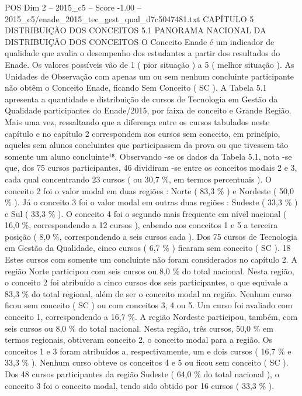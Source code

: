 \begin{textsample}{POS Dim 2 – 2015\_c5 – Score -1.00 – 2015\_c5/enade\_2015\_tec\_gest\_qual\_d7c5047481.txt}  \label{ex:f2_pos_277}
CAPÍTULO 5 DISTRIBUIÇÃO DOS CONCEITOS 5.1 PANORAMA NACIONAL DA DISTRIBUIÇÃO DOS CONCEITOS O Conceito Enade é um indicador de qualidade que avalia o desempenho dos estudantes a partir dos resultados do Enade.
Os valores possíveis vão de 1 ( pior situação ) a 5 ( melhor situação ).
As Unidades de Observação com apenas um ou sem nenhum concluinte participante não obtêm o Conceito Enade, ficando Sem Conceito ( SC ).
A Tabela 5.1 apresenta a quantidade e distribuição de cursos de Tecnologia em Gestão da Qualidade participantes do Enade/2015, por faixa de conceito e Grande Região.
Mais uma vez, ressaltando que a diferença entre os cursos tabulados neste capítulo e no capítulo 2 correspondem aos cursos sem conceito, em princípio, aqueles sem alunos concluintes que participassem da prova ou que tivessem tão somente um aluno concluinte¹⁸.
Observando -se os dados da Tabela 5.1, nota -se que, dos 75 cursos participantes, 46 dividiram -se entre os conceitos modais 2 e 3, cada qual concentrando 23 cursos ( ou 30,7 \%, em termos percentuais ).
O conceito 2 foi o valor modal em duas regiões : Norte ( 83,3 \% ) e Nordeste ( 50,0 \% ).
Já o conceito 3 foi o valor modal em outras duas regiões : Sudeste ( 33,3 \% ) e Sul ( 33,3 \% ).
O conceito 4 foi o segundo mais frequente em nível nacional ( 16,0 \%, correspondendo a 12 cursos ), cabendo aos conceitos 1 e 5 a terceira posição ( 8,0 \%, correspondendo a seis cursos cada ).
Dos 75 cursos de Tecnologia em Gestão da Qualidade, cinco cursos ( 6,7 \% ) ficaram sem conceito ( SC ). 18 Estes cursos com somente um concluinte não foram considerados no capítulo 2.
A região Norte participou com seis cursos ou 8,0 \% do total nacional.
Nesta região, o conceito 2 foi atribuído a cinco cursos dos seis participantes, o que equivale a 83,3 \% do total regional, além de ser o conceito modal na região.
Nenhum curso ficou sem conceito ( SC ) ou com conceitos 3, 4 ou 5.
Um curso foi avaliado com conceito 1, correspondendo a 16,7 \%.
A região Nordeste participou, também, com seis cursos ou 8,0 \% do total nacional.
Nesta região, três cursos, 50,0 \% em termos regionais, obtiveram conceito 2, o conceito modal para a região.
Os conceitos 1 e 3 foram atribuídos a, respectivamente, um e dois cursos ( 16,7 \% e 33,3 \% ).
Nenhum curso obteve os conceitos 4 e 5 ou ficou sem conceito ( SC ).
Dos 48 cursos participantes da região Sudeste ( 64,0 \% do total nacional ), o conceito 3 foi o conceito modal, tendo sido obtido por 16 cursos ( 33,3 \% ).

\end{textsample}
